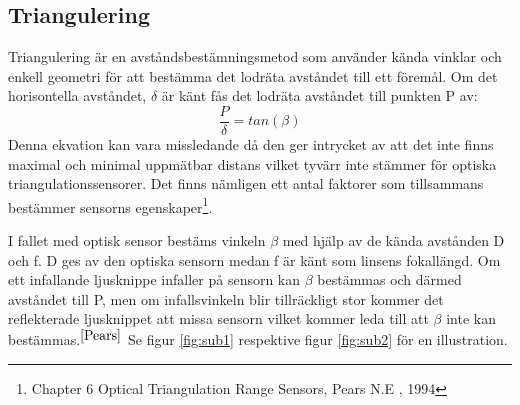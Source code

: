 \documentclass[a4paper,12pt,fleqn]{article}
\begin{document}
\subsection{Triangulering}
Triangulering är en avståndsbestämningsmetod som använder kända vinklar och enkell geometri för att bestämma det lodräta avståndet till ett föremål.
Om det horisontella avståndet, \begin{math}\delta\end{math} är känt fås det lodräta avståndet till punkten P av:
\begin{equation}
\label{eq:angle}
\frac{P}{\delta}=tan(\beta)
\end{equation}
Denna ekvation kan vara missledande då den ger intrycket av att det inte finns maximal och minimal uppmätbar distans vilket tyvärr inte stämmer för optiska triangulationssensorer.
Det finns nämligen ett antal faktorer som tillsammans bestämmer sensorns egenskaper\footnote{\label{Pears}Chapter 6 Optical Triangulation Range Sensors, Pears N.E , 1994}.

I fallet med optisk sensor bestäms vinkeln \begin{math}\beta\end{math} med hjälp av de kända avstånden D och f. D ges av den optiska sensorn medan f är känt som linsens fokallängd. Om ett infallande ljusknippe infaller på sensorn kan \begin{math}\beta\end{math} bestämmas och därmed avståndet till P, men om  infallsvinkeln blir tillräckligt stor kommer det reflekterade ljusknippet att missa sensorn vilket kommer leda till att \begin{math}\beta\end{math} inte kan bestämmas.$^{\ref{Pears}}$ Se figur \ref{fig:sub1} respektive figur \ref{fig:sub2} för en illustration.
\end{document}
